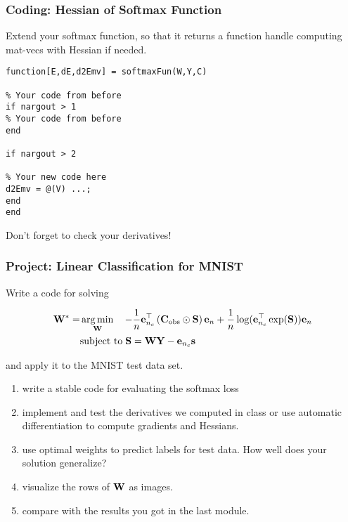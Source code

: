 \documentclass[12pt,fleqn,handout]{beamer}
\begin{document}
\begin{frame}[fragile]\frametitle{Coding: Hessian of Softmax Function}

Extend your softmax function, so that it returns a function handle computing mat-vecs with Hessian if needed.

\begin{verbatim}
function[E,dE,d2Emv] = softmaxFun(W,Y,C)

% Your code from before
if nargout > 1
% Your code from before
end

if nargout > 2

% Your new code here
d2Emv = @(V) ...;
end
end
\end{verbatim}
\begin{center}
	Don't forget to check your derivatives!
\end{center}
\end{frame}


\begin{frame}\frametitle{Project: Linear Classification for MNIST}
	 Write a code for solving

	\begin{align*}
	 {\bf W}^* = & \operatorname*{arg\,min}_{{\bf W}} \quad - \frac{1}{n}{\bf e}_{n_c}^{\top} \left( {\bf C}_{\rm obs} \odot {\bf S}\right) {\bf e}_{n} 
	+ \frac{1}{n} \log({\bf e}_{n_c}^\top \exp({\bf S})){\bf e}_n \\
	          & \text{subject to} \;{\bf S} = {\bf W} {\bf Y} - {\bf e}_{n_c} {\bf s}
	\end{align*}
	
			and apply it to the MNIST test data set.
			
	\begin{enumerate}
		\item write a stable code for evaluating the softmax loss
		
		\item implement and test the derivatives we computed in class or use automatic differentiation to compute gradients and Hessians.
		
		\item use optimal weights to predict labels for test data. How well does your solution generalize?
		
		\item visualize the rows of ${\bf W}$ as images.
		
		\item compare with the results you got in the last module.
	\end{enumerate}

\end{frame}
\end{document}

